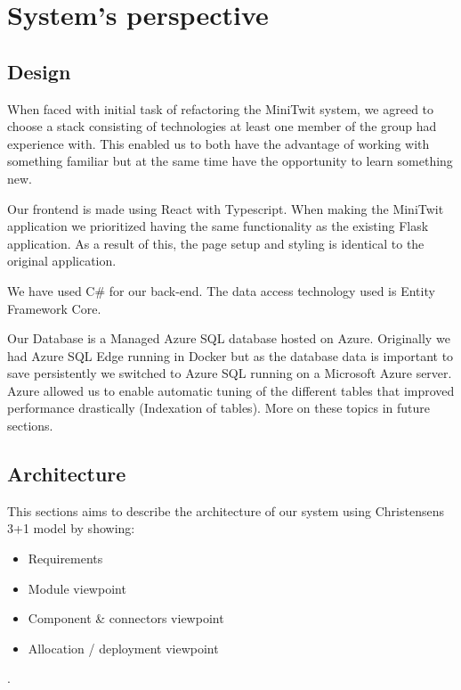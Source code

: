 \section{System's perspective}
\subsection{Design}
When faced with initial task of refactoring the MiniTwit system, we agreed to choose a stack consisting of technologies at least one member of the group had experience with.
This enabled us to both have the advantage of working with something familiar but at the same time have the opportunity to learn something new. 

Our frontend is made using React with Typescript. When making the MiniTwit application we prioritized having the same functionality as the existing Flask application. As a result of this, the page setup and styling is identical to the original application.

We have used C\# for our back-end. The data access technology used is Entity Framework Core.

Our Database is a Managed Azure SQL database hosted on Azure. Originally we had Azure SQL Edge running in Docker but as the database data is important to save persistently we switched to Azure SQL running on a Microsoft Azure server. Azure allowed us to enable automatic tuning of the different tables that improved performance drastically (Indexation of tables). More on these topics in future sections.


\subsection{Architecture}
This sections aims to describe the architecture of our system using Christensens 3+1 model \cite{architecturemodel} by showing:
\begin{itemize}
    \item Requirements
    \item Module viewpoint 
    \item Component \& connectors viewpoint 
    \item Allocation / deployment viewpoint
\end{itemize}.
    
